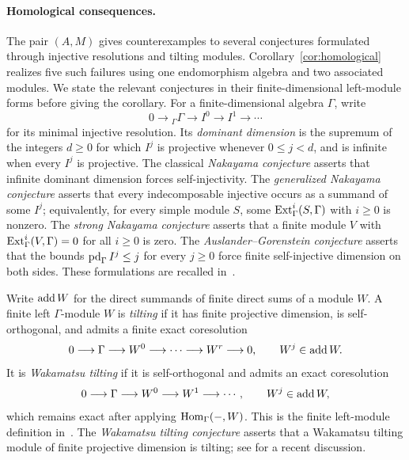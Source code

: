 \paragraph{Homological consequences.}
The pair $(A,M)$ gives counterexamples to several conjectures formulated
through injective resolutions and tilting modules. Corollary~\ref{cor:homological}
realizes five such failures using one endomorphism algebra and two
associated modules. We state the relevant conjectures in their
finite-dimensional left-module forms before giving the corollary.
For a finite-dimensional algebra $\Gamma$, write
\[
 0\longrightarrow {}_\Gamma\Gamma\longrightarrow I^0
 \longrightarrow I^1\longrightarrow\cdots
\]
for its minimal injective resolution. Its \emph{dominant dimension} is
the supremum of the integers $d\geq0$ for which $I^j$ is projective
whenever $0\leq j<d$, and is infinite when every $I^j$
is projective. The classical \emph{Nakayama conjecture} asserts that
infinite dominant dimension forces self-injectivity.
The \emph{generalized Nakayama conjecture} asserts that every
indecomposable injective occurs as a summand of some $I^j$; equivalently,
for every simple module $S$, some $\operatorname{Ext}_\Gamma^i(S,\Gamma)$ with
$i\geq0$ is nonzero. The \emph{strong Nakayama conjecture} asserts
that a finite module $V$ with $\operatorname{Ext}_\Gamma^i(V,\Gamma)=0$ for all
$i\geq0$ is zero. The \emph{Auslander--Gorenstein conjecture} asserts
that the bounds $\operatorname{pd}_\Gamma I^j\leq j$ for every $j\geq0$ force
finite self-injective dimension on both sides. These formulations are
recalled in~\cite[Introduction]{Zhang2018HomologicalConjectures}.

Write $\operatorname{add} W$ for the direct summands of finite direct sums of a
module $W$. A finite left $\Gamma$-module $W$ is \emph{tilting} if it
has finite projective dimension, is self-orthogonal, and admits a
finite exact coresolution
\[
 0\longrightarrow\Gamma\longrightarrow W^0\longrightarrow\cdots
 \longrightarrow W^r\longrightarrow0,\qquad W^j\in\operatorname{add} W.
\]
It is \emph{Wakamatsu tilting} if it is self-orthogonal and admits an
exact coresolution
\[
 0\longrightarrow\Gamma\longrightarrow W^0\longrightarrow W^1
 \longrightarrow\cdots,\qquad W^j\in\operatorname{add} W,
\]
which remains exact after applying $\operatorname{Hom}_\Gamma(-,W)$. This is the
finite left-module definition in~\cite[Definition~2.1]{Huang2006}.
The \emph{Wakamatsu tilting conjecture} asserts that a Wakamatsu tilting
module of finite projective dimension is tilting; see
\cite{DivaaniAazarMahinFallahTousi2025} for a recent discussion.

